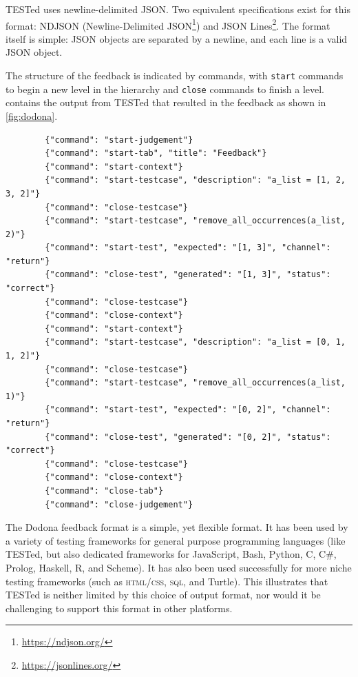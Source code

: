 \documentclass[../main]{subfiles}
\begin{document}
TESTed uses newline-delimited JSON\@.
Two equivalent specifications exist for this format: NDJSON (Newline-Delimited JSON\footnote{\url{https://ndjson.org/}}) and JSON Lines\footnote{\url{https://jsonlines.org/}}.
The format itself is simple: JSON objects are separated by a newline, and each line is a valid JSON object.

The structure of the feedback is indicated by commands, with \texttt{start} commands to begin a new level in the hierarchy and \texttt{close} commands to finish a level.
 contains the output from TESTed that resulted in the feedback as shown in \cref{fig:dodona}.

\begin{listing}
    \begin{verbatim}
        {"command": "start-judgement"}
        {"command": "start-tab", "title": "Feedback"}
        {"command": "start-context"}
        {"command": "start-testcase", "description": "a_list = [1, 2, 3, 2]"}
        {"command": "close-testcase"}
        {"command": "start-testcase", "remove_all_occurrences(a_list, 2)"}
        {"command": "start-test", "expected": "[1, 3]", "channel": "return"}
        {"command": "close-test", "generated": "[1, 3]", "status": "correct"}
        {"command": "close-testcase"}
        {"command": "close-context"}
        {"command": "start-context"}
        {"command": "start-testcase", "description": "a_list = [0, 1, 1, 2]"}
        {"command": "close-testcase"}
        {"command": "start-testcase", "remove_all_occurrences(a_list, 1)"}
        {"command": "start-test", "expected": "[0, 2]", "channel": "return"}
        {"command": "close-test", "generated": "[0, 2]", "status": "correct"}
        {"command": "close-testcase"}
        {"command": "close-context"}
        {"command": "close-tab"}
        {"command": "close-judgement"}
    \end{verbatim}
    \caption{
        Example of the output generated by TESTed, which is rendered in \cref{fig:dodona}.
        As before, each context consists of two test cases, the first of which has no tests, while the second has one test (the expected return value).
    }
    \label{lst:tested-output-example}
\end{listing}

The Dodona feedback format is a simple, yet flexible format.
It has been used by a variety of testing frameworks for general purpose programming languages (like TESTed, but also dedicated frameworks for JavaScript, Bash, Python, C, C\#, Prolog, Haskell, R, and Scheme).
It has also been used successfully for more niche testing frameworks (such as \textsc{html}/\textsc{css}, \textsc{sql}, and Turtle).
This illustrates that TESTed is neither limited by this choice of output format, nor would it be challenging to support this format in other platforms.
\end{document}
